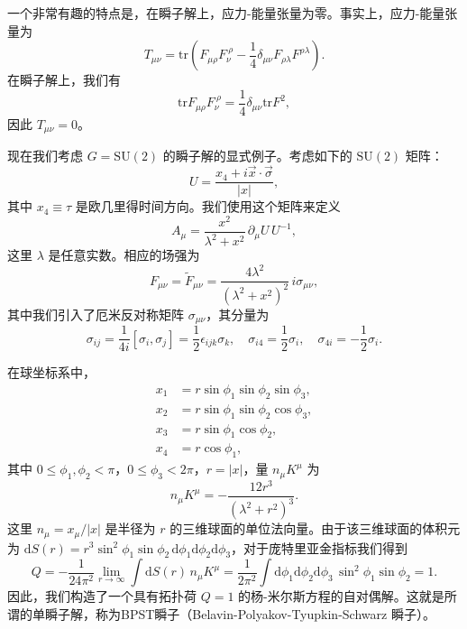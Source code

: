 一个非常有趣的特点是，在瞬子解上，应力-能量张量为零。事实上，应力-能量张量为
\begin{equation}
T_{\mu\nu} = \mathrm{tr}\left(F_{\mu\rho}F_{\nu}^{\ \rho} - \frac{1}{4}\delta_{\mu\nu}F_{\rho\lambda}F^{\rho\lambda}\right).
\end{equation}
在瞬子解上，我们有
\begin{equation}
\mathrm{tr}F_{\mu\rho}F_{\nu}^{\ \rho} = \frac{1}{4}\delta_{\mu\nu}\mathrm{tr}F^2,
\end{equation}
因此 \(T_{\mu\nu}=0\)。

现在我们考虑 \(G = \mathrm{SU}(2)\) 的瞬子解的显式例子。考虑如下的 \(\mathrm{SU}(2)\) 矩阵：
\begin{equation}
U = \frac{x_4 + i\vec{x}\cdot\vec{\sigma}}{|x|},
\end{equation}
其中 \(x_4 \equiv \tau\) 是欧几里得时间方向。我们使用这个矩阵来定义
\begin{equation}
A_{\mu} = \frac{x^2}{\lambda^2 + x^2}\,\partial_{\mu}U\,U^{-1}, \label{eq:BPST1}
\end{equation}
这里 \(\lambda\) 是任意实数。相应的场强为
\begin{equation}
F_{\mu\nu} = \tilde{F}_{\mu\nu} = \frac{4\lambda^2}{(\lambda^2 + x^2)^2}\,i\sigma_{\mu\nu}, \label{eq:BPST2}
\end{equation}
其中我们引入了厄米反对称矩阵 \(\sigma_{\mu\nu}\)，其分量为
\begin{equation}
\sigma_{ij} = \frac{1}{4i}[\sigma_i,\sigma_j] = \frac{1}{2}\epsilon_{ijk}\sigma_k,\quad
\sigma_{i4} = \frac{1}{2}\sigma_i,\quad
\sigma_{4i} = -\frac{1}{2}\sigma_i.
\end{equation}

在球坐标系中，
\begin{align*}
x_1 &= r \sin\phi_1 \sin\phi_2 \sin\phi_3,\\
x_2 &= r \sin\phi_1 \sin\phi_2 \cos\phi_3,\\
x_3 &= r \sin\phi_1 \cos\phi_2,\\
x_4 &= r \cos\phi_1,
\end{align*}
其中 \(0 \le \phi_1,\phi_2 < \pi\)，\(0 \le \phi_3 < 2\pi\)，\(r = |x|\)，量 \(n_\mu K^\mu\) 为
\begin{equation}
n_\mu K^\mu = -\frac{12r^3}{(\lambda^2 + r^2)^3}.
\end{equation}
这里 \(n_\mu = x_\mu/|x|\) 是半径为 \(r\) 的三维球面的单位法向量。由于该三维球面的体积元为 \(\mathrm{d}S(r) = r^3 \sin^2\phi_1 \sin\phi_2\, \mathrm{d}\phi_1\mathrm{d}\phi_2\mathrm{d}\phi_3\)，对于庞特里亚金指标我们得到
\begin{equation}
Q = -\frac{1}{24\pi^2} \lim_{r\to\infty} \int \mathrm{d}S(r)\, n_\mu K^\mu = \frac{1}{2\pi^2} \int \mathrm{d}\phi_1\mathrm{d}\phi_2\mathrm{d}\phi_3\, \sin^2\phi_1 \sin\phi_2 = 1.
\end{equation}
因此，我们构造了一个具有拓扑荷 \(Q=1\) 的杨-米尔斯方程的自对偶解。这就是所谓的单瞬子解，称为BPST瞬子（Belavin-Polyakov-Tyupkin-Schwarz 瞬子）。


